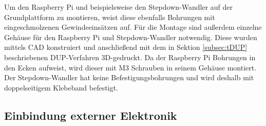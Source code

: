 Um den Raspberry Pi und beispielsweise den Stepdown-Wandler auf der Grundplattform zu montieren, weist diese ebenfalls Bohrungen mit eingeschmolzenen Gewindeeinsätzen auf. Für die Montage sind außerdem einzelne Gehäuse für den Raspberry Pi und Stepdown-Wandler notwendig. Diese wurden mittels \ac{CAD} konstruiert und anschließend mit dem in Sektion \ref{subsec:tDUP} beschriebenen \ac{DUP}-Verfahren 3D-gedruckt. Da der Raspberry Pi Bohrungen in den Ecken aufweist, wird dieser mit M3 Schrauben in seinem Gehäuse montiert. Der Stepdown-Wandler hat keine Befestigungsbohrungen und wird deshalb mit doppelseitigem Klebeband befestigt. 

\subsection{Einbindung externer Elektronik}
\label{subsec:elekExtern}

